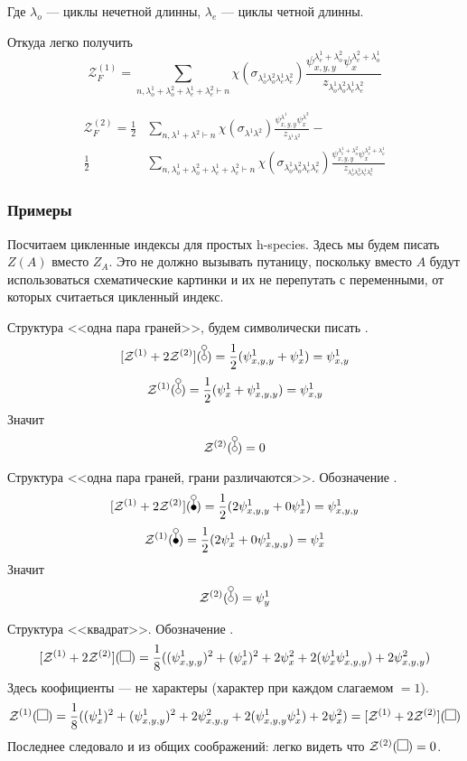 Где $\lambda_o$ --- циклы нечетной длинны, $\lambda_e$ ---
циклы четной длинны.

Откуда легко получить
\begin{equation}
\label{eq:h-fr2}
\mathcal Z_F^{(1)} = 
\sum_{n, \lambda_o^1 + \lambda_o^2 + \lambda_e^1 + \lambda_e^2 \vdash
n}\chi(\sigma_{\lambda_o^1 \lambda_o^2 \lambda_e^1 \lambda_e^2})
\frac{\psi_{x, y, y}^{\lambda_e^1 + \lambda_o^2} \psi_{x}^{\lambda_e^2 + 
\lambda_o^1}}{z_{\lambda_o^1 \lambda_o^2 \lambda_e^1 \lambda_e^2}}
\end{equation}

\begin{equation}
\begin{split}
\mathcal Z_F^{(2)} = 
\frac{1}{2}&
\sum_{n, \lambda^1 + \lambda^2 \vdash n}\chi(\sigma_{\lambda^1 \lambda^2})
\frac{\psi_{x, y, y}^{\lambda^1} \psi_{x}^{\lambda^2}}{z_{\lambda^1 \lambda^2}}
- \\
\frac{1}{2}&
\sum_{n, \lambda_o^1 + \lambda_o^2 + \lambda_e^1 + \lambda_e^2 \vdash
n}\chi(\sigma_{\lambda_o^1 \lambda_o^2 \lambda_e^1 \lambda_e^2})
\frac{\psi_{x, y, y}^{\lambda_e^1 + \lambda_o^2} \psi_{x}^{\lambda_e^2 + 
\lambda_o^1}}{z_{\lambda_o^1 \lambda_o^2 \lambda_e^1 \lambda_e^2}}
\end{split}
\end{equation}

\subsubsection{Примеры}
Посчитаем цикленные индексы для простых h-species.
Здесь мы будем писать $Z(A)$ вместо $Z_A$. Это не должно вызывать путаницу,
поскольку вместо $A$ будут использоваться схематические картинки и их
не перепутать с переменными, от которых считаеться цикленный индекс. 

Структура <<одна пара граней>>, будем символически писать \dA.
$$
\Zfull(\dA) = \frac{1}{2}(\psi_{x,y,y}^1 + \psi_{x}^1) = \psi_{x,y}^1
$$
$$
\mathcal Z^{(1)}(\dA) = \frac{1}{2}(\psi_{x}^1 + \psi_{x, y, y}^1) = \psi_{x,y}^1
$$
Значит
$$
\mathcal Z^{(2)}(\dA) = 0
$$

Структура <<одна пара граней, грани различаются>>. Обозначение \dB.
$$
\Zfull(\dB) = \frac{1}{2}(2\psi_{x,y,y}^1 + 0\psi_{x}^1) = \psi_{x,y,y}^1
$$
$$
\mathcal Z^{(1)}(\dB) = \frac{1}{2}(2\psi_{x}^1 + 0\psi_{x, y, y}^1) = \psi_{x}^1
$$
Значит
$$
\mathcal Z^{(2)}(\dA) = \psi_{y}^1
$$

Структура <<квадрат>>. Обозначение \dAA.
$$
\Zfull(\dAA) = \frac{1}{8}((\psi_{x,y,y}^1)^2 + (\psi_{x}^1)^2 + 2\psi_{x}^2 +
2(\psi_x^1\psi_{x,y,y}^1) + 2\psi_{x,y,y}^2)
$$
Здесь коофициенты --- не характеры (характер при каждом слагаемом $= 1$).
$$
\mathcal Z^{(1)}(\dAA) = \frac{1}{8}((\psi_{x}^1)^2 + (\psi_{x, y, y}^1)^2 +
2\psi_{x, y, y}^2 + 2(\psi_{x, y, y}^1\psi_{x}^1) + 2\psi_{x}^2) = \Zfull(\dAA)
$$
Последнее следовало и из общих соображений: легко видеть что $\mathcal
Z^{(2)}(\dAA) = 0$.

